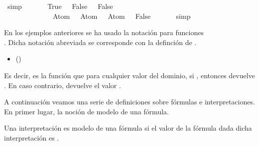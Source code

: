 \begin{isabellebody}
\ simp\isanewline
\isanewline
\ \ \isamarkupfalse%
\ {\isachardoublequoteopen}{\isacharparenleft}{\isasymA}\ {\isacharparenleft}{}\ {\isacharcolon}{\isacharequal}\ True{\isacharcomma}\ {}\ {\isacharcolon}{\isacharequal}\ False{\isacharcomma}\ {}\ {\isacharcolon}{\isacharequal}\ False{\isacharparenright}\ \isanewline
\ \ \ \ \ \ \ \ \ \ \ \ {\isasymTurnstile}\ {\isacharparenleft}\isactrlbold {\isasymnot}\ {\isacharparenleft}{\isacharparenleft}Atom\ {}\ \isactrlbold {\isasymand}\ Atom\ {}{\isacharparenright}{\isacharparenright}\ \isactrlbold {\isasymrightarrow}\ Atom\ {}{\isacharparenright}{\isacharparenright}\ {\isacharequal}\ False{\isachardoublequoteclose}\ \isanewline
\ \ \ \ \isamarkupfalse%
\ simp%
\endisatagproof
{\isafoldproof}%
%
\isadelimproof
\isanewline
%
\endisadelimproof
\isanewline
{}\isamarkupfalse%
%
\begin{isamarkuptext}%
En los ejemplos anteriores se ha usado la notación para
  funciones\\ . Dicha notación abreviada se corresponde con 
  la definción de .

  \begin{itemize}
    \item[]  
      \hfill ()
  \end{itemize}

  Es decir,  es la función que para cualquier valor  del 
  dominio, si , entonces devuelve . En caso contrario, 
  devuelve el valor .

  A continuación veamos una serie de definiciones sobre fórmulas e 
  interpretaciones. En primer lugar, la noción de modelo de una 
  fórmula.

  \begin{definicion}
  Una interpretación es modelo de una fórmula si el valor de la
  fórmula dada dicha interpretación es . 
  \end{definicion}


\end{isamarkuptext}
\end{isabellebody}
